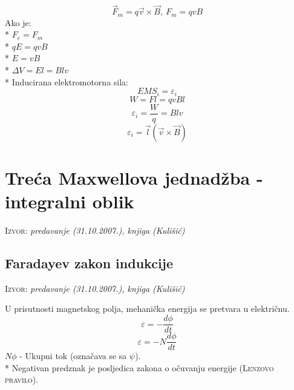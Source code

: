 \documentclass{report}
\begin{document}
$$\vec{F} _m = q \vec{v} \times \vec{B}, \: F _m = qvB$$
Ako je:\\*
$F_e = F_m$\\*
$qE = qvB$\\*
$E = vB$\\*
$\Delta V = El = Blv$\\*
Inducirana elektromotorna sila:
$$EMS _i = \varepsilon _i$$
$$W = Fl = qvBl$$
$$\varepsilon _i = \frac{W}{q} = Blv$$
$$\varepsilon _i = \vec{l}(\vec{v} \times \vec{B})$$

\section{Treća Maxwellova jednadžba - integralni oblik}
\small \textsc{Izvor:} \textit{predavanje (31.10.2007.), knjiga (Kulišić)}

\subsection{Faradayev zakon indukcije}
\small \textsc{Izvor:} \textit{predavanje (31.10.2007.), knjiga (Kulišić)}

U prisutnosti magnetskog polja, mehanička energija se pretvara u električnu.
$$\varepsilon = - \frac{d \phi}{dt}$$
$$\varepsilon = - N \frac{d \phi}{dt}$$
$N \phi$ - Ukupni tok (označava se sa $\psi $).\\*
Negativan predznak je posljedica zakona o očuvanju energije (\textsc{Lenzovo pravilo}).
\end{document}
